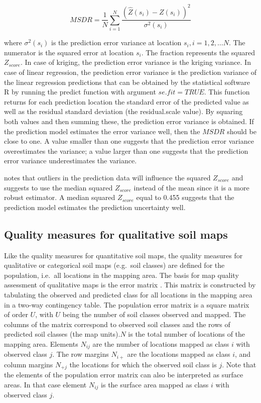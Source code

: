 \documentclass[10pt,b5paper,]{book}
\theoremstyle{definition}
\theoremstyle{definition}
\theoremstyle{definition}
\theoremstyle{remark}
\begin{document}
\begin{equation}
M S D R = \frac{1}{N} \sum_{i=1}^{N} \frac{(\hat{Z}(s_i) - Z(s_i))^2}{\sigma^2(s_i)}
\end{equation}

where \({\sigma^2(s_i)}\) is the prediction error variance at location
\({s_i, i = 1, 2, \dots N}\). The numerator is the squared error at
location \({s_i}\). The fraction represents the squared \({Z_{score}}\).
In case of kriging, the prediction error variance is the kriging
variance. In case of linear regression, the prediction error variance is
the prediction variance of the linear regression predictions that can be
obtained by the statistical software R by running the predict function
with argument \({se.fit = TRUE}\). This function returns for each
prediction location the standard error of the predicted value as well as
the residual standard deviation (the residual.scale value). By squaring
both values and then summing these, the prediction error variance is
obtained. If the prediction model estimates the error variance well,
then the \({MSDR}\) should be close to one. A value smaller than one
suggests that the prediction error variance overestimates the variance;
a value larger than one suggests that the prediction error variance
underestimates the variance.

\citet{lark2000comparison} notes that outliers in the prediction data
will influence the squared \({Z_{score}}\) and suggests to use the
median squared \({Z_{score}}\) instead of the mean since it is a more
robust estimator. A median squared \({Z_{score}}\) equal to 0.455
suggests that the prediction model estimates the prediction uncertainty
well.

\hypertarget{quality-measures-for-qualitative-soil-maps}{%
\subsection{Quality measures for qualitative soil
maps}\label{quality-measures-for-qualitative-soil-maps}}

Like the quality measures for quantitative soil maps, the quality
measures for qualitative or categorical soil maps (e.g.~soil classes)
are defined for the population, i.e.~all locations in the mapping area.
The basis for map quality assessment of qualitative maps is the error
matrix \citep{brus2011sampling, lark1995components}. This matrix is
constructed by tabulating the observed and predicted class for all
locations in the mapping area in a two-way contingency table. The
population error matrix is a square matrix of order \(U\), with \(U\)
being the number of soil classes observed and mapped. The columns of the
matrix correspond to observed soil classes and the rows of predicted
soil classes (the map units).\(N\) is the total number of locations of
the mapping area. Elements \(N_{ij}\) are the number of locations mapped
as class \(i\) with observed class \(j\). The row margins \(N_{i+}\) are
the locations mapped as class \(i\), and column margins \(N_{+j}\) the
locations for which the observed soil class is \(j\). Note that the
elements of the population error matrix can also be interpreted as
surface areas. In that case element \(N_{ij}\) is the surface area
mapped as class \(i\) with observed class \(j\).
\end{document}

